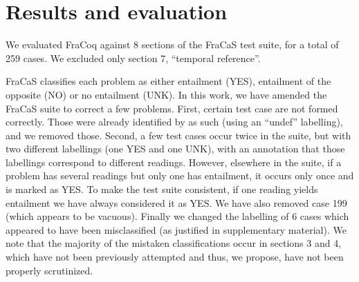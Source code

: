 \documentclass[11pt]{article}
\begin{document}
\section{Results and evaluation}

We evaluated FraCoq against 8 sections of the FraCaS test suite, for a
total of 259 cases. We excluded only section 7, ``temporal reference''.

FraCaS classifies each problem as either entailment (YES),
entailment of the opposite (NO) or no entailment (UNK).  In this work,
we have amended the FraCaS suite to correct a few problems. First,
certain test case are not formed correctly. Those were already
identified by \citet{maccartney:2007} as such (using an ``undef''
labelling), and we removed those. Second, a few test cases occur twice
in the suite, but with two different labellings (one YES and one UNK),
with an annotation that those labellings correspond to different
readings. However, elsewhere in the suite, if a problem has several
readings but only one has entailment, it occurs only once and is
marked as YES. To make the test suite consistent, if one reading
yields entailment we have always considered it as YES. We have also
removed case 199 (which appears to be vacuous). Finally we changed the
labelling of 6 cases
which appeared to have been
misclassified (as justified in supplementary material). We note that the majority of the mistaken
classifications occur in sections 3 and 4, which have not been
previously attempted and thus, we propose, have not been properly
scrutinized.
\end{document}
